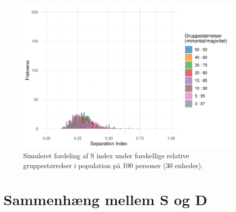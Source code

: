 \documentclass[
]{book}
\begin{document}
\begin{figure}
\includegraphics[width=1\linewidth]{en-befolkning-blander-sig_files/figure-latex/fig-9-3-1} \caption{Simuleret fordeling af S index under forskellige relative gruppestørrelser i population på 100 personer (30 enheder).}\label{fig:fig-9-3}
\end{figure}

\section{Sammenhæng mellem S og D}\label{forskel}
\end{document}

